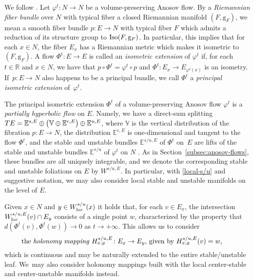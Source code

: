 \documentclass[pdftex]{sigma}
\newcommand{\g}{\mathrm{g}}
\newcommand{\R}{\mathbb{R}}
\newcommand{\E}{\mathbb{E}}
\numberwithin{equation}{section}
\theoremstyle{definition}
\begin{document}
We follow \cite[Section 2]{lefeuvre2023isometric}. Let $\varphi^t \colon N \rightarrow N$ be a volume-preserving Anosov flow. By a \emph{Riemannian fiber bundle} over $N$ with typical fiber a closed Riemannian manifold $(F,\g_F)$, we mean a smooth fiber bundle $p \colon E \rightarrow N$ with typical fiber $F$ which admits a reduction of its structure group to ${\rm Iso}(F,\g_F)$. In particular, this implies that for each $x \in N$, the fiber $E_x$ has a Riemannian metric which makes it isometric to $(F,\g_F)$. A flow $\Phi^t\colon E\to E$ is called an \emph{isometric extension} of $\varphi^t$ if, for each $t\in \R$ and $x\in N$, we have that $p\circ \Phi^t = \varphi^t\circ p$ and $\Phi^t\colon E_x\to E_{\varphi^t(x)}$ is an isometry. If~$p\colon E\to N$ also happens to be a principal bundle, we call $\Phi^t$ a \emph{principal isometric extension} of~$\varphi^t$.

The principal isometric extension $\Phi^t$ of a volume-preserving Anosov flow $\varphi^t$ is a \emph{partially hyperbolic flow} on $E$. Namely, we have a direct-sum splitting $TE = \E^{s,E} \oplus \smash{\bigl(\mathbb{V} \oplus \E^{c,E}\bigr)} \oplus \E^{u,E}$, where $\mathbb{V}$ is the vertical distribution of the fibration $p\colon E\to N$, the distribution $\E^{c,E}$ is one-dimensional and tangent to the flow $\Phi^t$, and the stable and unstable bundles $\E^{s/u,E}$ of $\Phi^t$ on~$E$ are lifts of the stable and unstable bundles $\E^{s/u}$ of $\varphi^t$ on $N$ \smash{\big(i.e., ${\rm d}p\bigl(\E^{s/u,E}\bigr) = \E^{s/u}$\big)}. As in Section~\ref{subsec:anosov-flows}, these bundles are all uniquely integrable, and we denote the corresponding stable and unstable foliations on $E$ by $W^{s/u,E}$. In particular, with \eqref{local-s/u} and suggestive notation, we may also consider local stable and unstable manifolds on the level of $E$.

Given $x\in N$ and $y\in W^{s/u}_{\rm loc}(x)$ it holds that, for each $v\in E_x$, the intersection $W^{s/u,E}_{\rm loc}(v)\cap E_y$ consists of a single point $w$, characterized by the property that $d(\Phi^t(v), \Phi^t(w))\to 0$ as $t \to +\infty$. This allows us to consider
\begin{equation}\label{holonomy-map}
 \parbox{.9\textwidth}{the \emph{holonomy mapping} $H_{x,y}^{s/u, E}\colon E_x\to E_y$, given by $H_{x,y}^{s/u,E}(v) = w$,}
\end{equation}which is continuous and may be naturally extended to the entire stable/unstable leaf. We~may also consider holonomy mappings built with the local center-stable and center-unstable manifolds instead.
\end{document}

